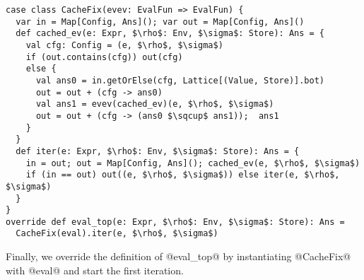 \begin{lstlisting}
case class CacheFix(evev: EvalFun => EvalFun) {
  var in = Map[Config, Ans](); var out = Map[Config, Ans]()
  def cached_ev(e: Expr, $\rho$: Env, $\sigma$: Store): Ans = {
    val cfg: Config = (e, $\rho$, $\sigma$)
    if (out.contains(cfg)) out(cfg)
    else {
      val ans0 = in.getOrElse(cfg, Lattice[(Value, Store)].bot)
      out = out + (cfg -> ans0)
      val ans1 = evev(cached_ev)(e, $\rho$, $\sigma$)
      out = out + (cfg -> (ans0 $\sqcup$ ans1));  ans1
    }
  }
  def iter(e: Expr, $\rho$: Env, $\sigma$: Store): Ans = {
    in = out; out = Map[Config, Ans](); cached_ev(e, $\rho$, $\sigma$)
    if (in == out) out((e, $\rho$, $\sigma$)) else iter(e, $\rho$, $\sigma$)
  }
}
override def eval_top(e: Expr, $\rho$: Env, $\sigma$: Store): Ans = 
  CacheFix(eval).iter(e, $\rho$, $\sigma$)
\end{lstlisting}

Finally, we override the definition of @eval_top@ by instantiating @CacheFix@ with @eval@ and start 
the first iteration.
